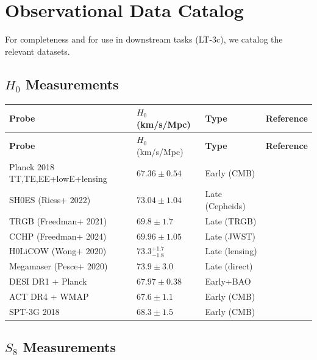 \documentclass[11pt,a4paper]{article}
\theoremstyle{plain}
\theoremstyle{definition}
\theoremstyle{remark}
\begin{document}
\section{Observational Data Catalog}
\label{sec:data}

For completeness and for use in downstream tasks (LT-3c), we catalog
the relevant datasets.

\subsection{$H_0$ Measurements}

\begin{longtable}{llll}
\toprule
\textbf{Probe} & $H_0$ (km/s/Mpc) & \textbf{Type} & \textbf{Reference} \\
\midrule
\endfirsthead
\toprule
\textbf{Probe} & $H_0$ (km/s/Mpc) & \textbf{Type} & \textbf{Reference} \\
\midrule
\endhead
Planck 2018 TT,TE,EE+lowE+lensing & $67.36 \pm 0.54$ & Early (CMB) & \cite{Planck18VI} \\
SH0ES (Riess+ 2022) & $73.04 \pm 1.04$ & Late (Cepheids) & \cite{Riess22} \\
TRGB (Freedman+ 2021) & $69.8 \pm 1.7$ & Late (TRGB) & \cite{Freedman21} \\
CCHP (Freedman+ 2024) & $69.96 \pm 1.05$ & Late (JWST) & \cite{Freedman24} \\
H0LiCOW (Wong+ 2020) & $73.3^{+1.7}_{-1.8}$ & Late (lensing) & \cite{Wong20} \\
Megamaser (Pesce+ 2020) & $73.9 \pm 3.0$ & Late (direct) & \cite{Pesce20} \\
DESI DR1 + Planck & $67.97 \pm 0.38$ & Early+BAO & \cite{DESI24} \\
ACT DR4 + WMAP & $67.6 \pm 1.1$ & Early (CMB) & \cite{ACT21} \\
SPT-3G 2018 & $68.3 \pm 1.5$ & Early (CMB) & \cite{SPT23} \\
\bottomrule
\end{longtable}

\subsection{$S_8$ Measurements}
\end{document}
